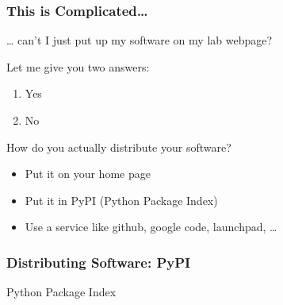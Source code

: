 \begin{frame}[fragile]
\frametitle{This is Complicated\ldots}
\ldots{} can't I just put up my software on my lab webpage?

\pause

Let me give you two answers:

\pause

\begin{enumerate}
\item Yes

\item No
\end{enumerate}

\end{frame}

\begin{frame}[fragile]
{}
How do you actually distribute your software?

\begin{itemize}
\item Put it on your home page
\item Put it in PyPI (Python Package Index)
\item Use a service like \alert{github}, \alert{google code}, \alert{launchpad}, \ldots
\end{itemize}
\end{frame}

\begin{frame}[fragile]
\frametitle{Distributing Software: PyPI}

Python Package Index

\end{frame}


